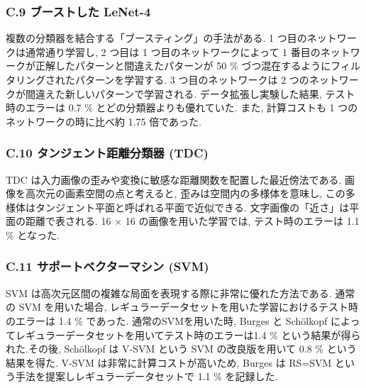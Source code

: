 \documentclass[twocolumn]{jarticle}     %
\begin{document}
\subsubsection{C.9 ブーストした LeNet-4 }
複数の分類器を結合する「ブースティング」の手法がある. 1 つ目のネットワークは通常通り学習し, 2 つ目は 1 つ目のネットワークによって 1 番目のネットワークが正解したパターンと間違えたパターンが 50 \% づつ混在するようにフィルタリングされたパターンを学習する. 3 つ目のネットワークは 2 つのネットワークが間違えた新しいパターンで学習される. データ拡張し実験した結果, テスト時のエラーは 0.7 \% とどの分類器よりも優れていた. また, 計算コストも 1 つのネットワークの時に比べ約 1.75 倍であった.

\subsubsection{C.10 タンジェント距離分類器 (TDC)}
TDC は入力画像の歪みや変換に敏感な距離関数を配置した最近傍法である. 画像を高次元の画素空間の点と考えると, 歪みは空間内の多様体を意味し, この多様体はタンジェント平面と呼ばれる平面で近似できる. 
文字画像の「近さ」は平面の距離で表される.
16 × 16 の画像を用いた学習では, テスト時のエラーは 1.1 \% となった.

\subsubsection{C.11 サポートベクターマシン (SVM)}
SVM は高次元区間の複雑な局面を表現する際に非常に優れた方法である. 通常の SVM を用いた場合, レギュラーデータセットを用いた学習におけるテスト時のエラーは 1.4 \% であった.
通常のSVMを用いた時, Burges と Sch\"{o}lkopf によってレギュラーデータセットを用いてテスト時のエラーは1.4 \% という結果が得られた.その後, Sch\"{o}lkopf は V-SVM という SVM の改良版を用いて 0.8 \% という結果を得た. V-SVM は非常に計算コストが高いため, Burges は RS=SVM という手法を提案しレギュラーデータセットで 1.1 \% を記録した.
\end{document}
